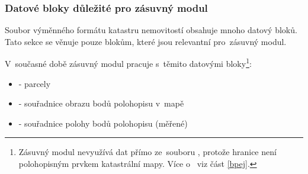 \subsubsection{Datové bloky důležité pro zásuvný modul}
\label{datove_bloky_zasuvny_modul}

Soubor výměnného formátu katastru nemovitostí obsahuje mnoho datový bloků. Tato sekce se věnuje pouze blokům, které jsou relevantní pro~zásuvný modul.

V~současné době zásuvný modul pracuje s~těmito datovými bloky\footnote{Zásuvný modul nevyužívá dat  přímo ze~souboru , protože hranice  není polohopisným prvkem katastrální mapy. Více o~ viz část \ref{bpej}.}:

	\begin{itemize}[leftmargin=1.5cm, noitemsep]
		\item \texttt{} - parcely
		\item \texttt{} - souřadnice obrazu bodů polohopisu v~mapě
		\item \texttt{} - souřadnice polohy bodů polohopisu (měřené)
	\end{itemize}

